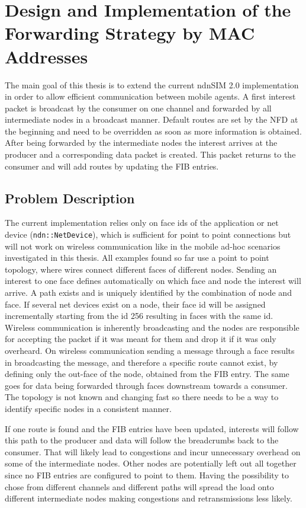 \chapter{Design and Implementation of the Forwarding Strategy by MAC Addresses}

The main goal of this thesis is to extend the current ndnSIM 2.0 implementation in order to allow efficient communication between mobile agents. A first interest packet is broadcast by the consumer on one channel and forwarded by all intermediate nodes in a broadcast manner. Default routes are set by the NFD at the beginning and need to be overridden as soon as more information is obtained. After being forwarded by the intermediate nodes the interest arrives at the producer and a corresponding data packet is created. This packet returns to the consumer and will add routes by updating the FIB entries.

\section{Problem Description}

The current implementation relies only on face ids of the application or net device (\texttt{ndn::NetDevice}), which is sufficient for point to point connections but will not work on wireless communication like in the mobile ad-hoc scenarios investigated in this thesis. All examples found so far use a point to point topology, where wires connect different faces of different nodes. Sending an interest to one face defines automatically on which face and node the interest will arrive. A path exists and is uniquely identified by the combination of node and face. If several net devices exist on a node, their face id will be assigned incrementally starting from the id 256 resulting in faces with the same id. Wireless communication is inherently broadcasting and the nodes are responsible for accepting the packet if it was meant for them and drop it if it was only overheard. On wireless communication sending a message through a face results in broadcasting the message, and therefore a specific route cannot exist, by defining only the out-face of the node, obtained from the FIB entry. The same goes for data being forwarded through faces downstream towards a consumer. The topology is not known and changing fast so there needs to be a way to identify specific nodes in a consistent manner.

If one route is found and the FIB entries have been updated, interests will follow this path to the producer and data will follow the breadcrumbs back to the consumer. That will likely lead to congestions and incur unnecessary overhead on some of the intermediate nodes. Other nodes are potentially left out all together since no FIB entries are configured to point to them. Having the possibility to chose from different channels and different paths will spread the load onto different intermediate nodes making congestions and retransmissions less likely.


